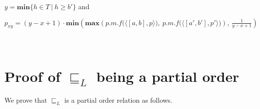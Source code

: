 \documentclass[final,3p, review, times]{util/elsarticle}
\begin{document}
$y=\mathbf{min}\{h\in T\ |\ h\geq b'\}$ and

$\displaystyle p_{xy}=(y-x+1)\cdot\mathbf{min}\left(\mathbf{max}\left(p.m.f\Big(\langle[a,b],p\rangle\Big),\ p.m.f\Big(\langle[a',b'],p'\rangle\Big)\right),\ \frac{1}{y-x+1}\right)$










\appendix

\section{\\Proof of $\sqsubseteq_L$ being a partial order}
\label{app:concrete_partial}

We prove that $\sqsubseteq_L$ is a partial order relation as follows.
\end{document}
